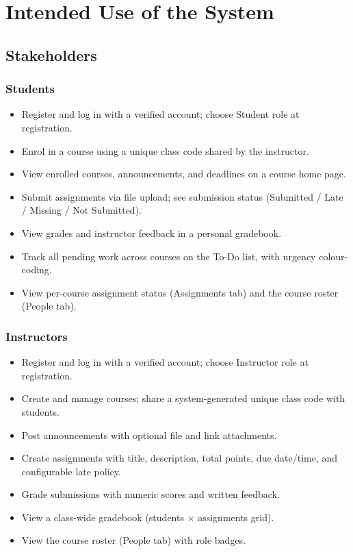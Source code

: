 \documentclass[12pt, a4paper]{article}
\begin{document}
\section{Intended Use of the System}

\subsection{Stakeholders}

\subsubsection*{Students}
\begin{itemize}
  \item Register and log in with a verified account; choose Student role at registration.
  \item Enrol in a course using a unique class code shared by the instructor.
  \item View enrolled courses, announcements, and deadlines on a course home page.
  \item Submit assignments via file upload; see submission status (Submitted / Late / Missing / Not Submitted).
  \item View grades and instructor feedback in a personal gradebook.
  \item Track all pending work across courses on the To-Do list, with urgency colour-coding.
  \item View per-course assignment status (Assignments tab) and the course roster (People tab).
\end{itemize}

\subsubsection*{Instructors}
\begin{itemize}
  \item Register and log in with a verified account; choose Instructor role at registration.
  \item Create and manage courses; share a system-generated unique class code with students.
  \item Post announcements with optional file and link attachments.
  \item Create assignments with title, description, total points, due date/time, and configurable late policy.
  \item Grade submissions with numeric scores and written feedback.
  \item View a class-wide gradebook (students $\times$ assignments grid).
  \item View the course roster (People tab) with role badges.
\end{itemize}
\end{document}
